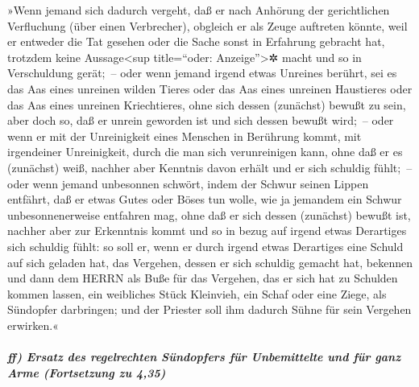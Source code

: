 »Wenn jemand sich dadurch vergeht, daß er nach Anhörung
der gerichtlichen Verfluchung (über einen Verbrecher), obgleich er als
Zeuge auftreten könnte, weil er entweder die Tat gesehen oder die Sache
sonst in Erfahrung gebracht hat, trotzdem keine Aussage\textless sup
title=``oder: Anzeige''\textgreater✲ macht und so in Verschuldung
gerät;~-- oder wenn jemand irgend etwas Unreines berührt,
sei es das Aas eines unreinen wilden Tieres oder das Aas eines unreinen
Haustieres oder das Aas eines unreinen Kriechtieres, ohne sich dessen
(zunächst) bewußt zu sein, aber doch so, daß er unrein geworden ist und
sich dessen bewußt wird;~-- oder wenn er mit der
Unreinigkeit eines Menschen in Berührung kommt, mit irgendeiner
Unreinigkeit, durch die man sich verunreinigen kann, ohne daß er es
(zunächst) weiß, nachher aber Kenntnis davon erhält und er sich schuldig
fühlt;~-- oder wenn jemand unbesonnen schwört, indem der
Schwur seinen Lippen entfährt, daß er etwas Gutes oder Böses tun wolle,
wie ja jemandem ein Schwur unbesonnenerweise entfahren mag, ohne daß er
sich dessen (zunächst) bewußt ist, nachher aber zur Erkenntnis kommt und
so in bezug auf irgend etwas Derartiges sich schuldig fühlt:
so soll er, wenn er durch irgend etwas Derartiges eine
Schuld auf sich geladen hat, das Vergehen, dessen er sich schuldig
gemacht hat, bekennen und dann dem HERRN als Buße für das
Vergehen, das er sich hat zu Schulden kommen lassen, ein weibliches
Stück Kleinvieh, ein Schaf oder eine Ziege, als Sündopfer darbringen;
und der Priester soll ihm dadurch Sühne für sein Vergehen erwirken.«

\hypertarget{ff-ersatz-des-regelrechten-suxfcndopfers-fuxfcr-unbemittelte-und-fuxfcr-ganz-arme-fortsetzung-zu-435}{%
\subparagraph{ff) Ersatz des regelrechten Sündopfers für Unbemittelte
und für ganz Arme (Fortsetzung zu
4,35)}\label{ff-ersatz-des-regelrechten-suxfcndopfers-fuxfcr-unbemittelte-und-fuxfcr-ganz-arme-fortsetzung-zu-435}}


